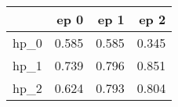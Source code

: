 \begin{tabular}{lrrr}
\toprule
{} &   ep 0 &   ep 1 &   ep 2 \\
\midrule
hp\_0 &  0.585 &  0.585 &  0.345 \\
hp\_1 &  0.739 &  0.796 &  0.851 \\
hp\_2 &  0.624 &  0.793 &  0.804 \\
\bottomrule
\end{tabular}
